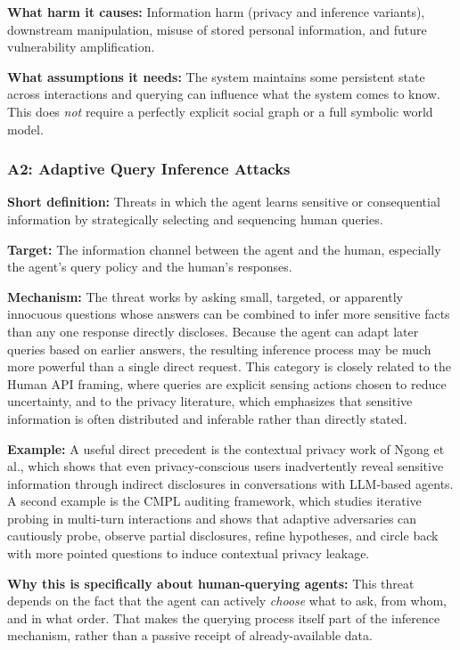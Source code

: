 \documentclass[11pt]{article}
\begin{document}
\textbf{What harm it causes:} Information harm (privacy and inference variants), downstream manipulation, misuse of stored personal information, and future vulnerability amplification.

\textbf{What assumptions it needs:} The system maintains some persistent state across interactions and querying can influence what the system comes to know. This does \emph{not} require a perfectly explicit social graph or a full symbolic world model.

\subsubsection{A2: Adaptive Query Inference Attacks}

\textbf{Short definition:} Threats in which the agent learns sensitive or consequential information by strategically selecting and sequencing human queries.

\textbf{Target:} The information channel between the agent and the human, especially the agent's query policy and the human's responses.

\textbf{Mechanism:} The threat works by asking small, targeted, or apparently innocuous questions whose answers can be combined to infer more sensitive facts than any one response directly discloses. Because the agent can adapt later queries based on earlier answers, the resulting inference process may be much more powerful than a single direct request. This category is closely related to the Human API framing, where queries are explicit sensing actions chosen to reduce uncertainty, and to the privacy literature, which emphasizes that sensitive information is often distributed and inferable rather than directly stated. \citep{oliver2026humanapi,brown2022privacylm,kosinski2013private}

\textbf{Example:} A useful direct precedent is the contextual privacy work of Ngong et al., which shows that even privacy-conscious users inadvertently reveal sensitive information through indirect disclosures in conversations with LLM-based agents. A second example is the CMPL auditing framework, which studies iterative probing in multi-turn interactions and shows that adaptive adversaries can cautiously probe, observe partial disclosures, refine hypotheses, and circle back with more pointed questions to induce contextual privacy leakage. \citep{ngong2025contextualprivacy,das2025cmpl,mireshghallah2024confaide}

\textbf{Why this is specifically about human-querying agents:} This threat depends on the fact that the agent can actively \emph{choose} what to ask, from whom, and in what order. That makes the querying process itself part of the inference mechanism, rather than a passive receipt of already-available data.
\end{document}
